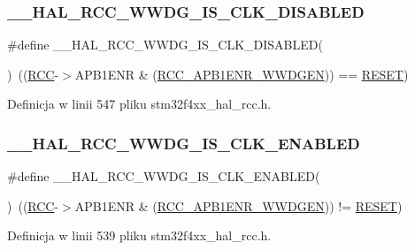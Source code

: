 \subsubsection{\texorpdfstring{\+\_\+\+\_\+\+H\+A\+L\+\_\+\+R\+C\+C\+\_\+\+W\+W\+D\+G\+\_\+\+I\+S\+\_\+\+C\+L\+K\+\_\+\+D\+I\+S\+A\+B\+L\+ED}{\_\_HAL\_RCC\_WWDG\_IS\_CLK\_DISABLED}}
{\footnotesize\ttfamily \#define \+\_\+\+\_\+\+H\+A\+L\+\_\+\+R\+C\+C\+\_\+\+W\+W\+D\+G\+\_\+\+I\+S\+\_\+\+C\+L\+K\+\_\+\+D\+I\+S\+A\+B\+L\+ED(\begin{DoxyParamCaption}{ }\end{DoxyParamCaption})~((\hyperlink{group___peripheral__declaration_ga74944438a086975793d26ae48d5882d4}{R\+CC}-\/$>$A\+P\+B1\+E\+NR \& (\hyperlink{group___peripheral___registers___bits___definition_gaf712b922ee776a972d2efa3da0ea4733}{R\+C\+C\+\_\+\+A\+P\+B1\+E\+N\+R\+\_\+\+W\+W\+D\+G\+EN})) == \hyperlink{group___exported__types_gga89136caac2e14c55151f527ac02daaffa589b7d94a3d91d145720e2fed0eb3a05}{R\+E\+S\+ET})}



Definicja w linii 547 pliku stm32f4xx\+\_\+hal\+\_\+rcc.\+h.

\mbox{\label{group___r_c_c___a_p_b1___peripheral___clock___enable___disable___status_ga9b26aff2638d1e0613b0ce0530f0cd48}} 
\subsubsection{\texorpdfstring{\+\_\+\+\_\+\+H\+A\+L\+\_\+\+R\+C\+C\+\_\+\+W\+W\+D\+G\+\_\+\+I\+S\+\_\+\+C\+L\+K\+\_\+\+E\+N\+A\+B\+L\+ED}{\_\_HAL\_RCC\_WWDG\_IS\_CLK\_ENABLED}}
{\footnotesize\ttfamily \#define \+\_\+\+\_\+\+H\+A\+L\+\_\+\+R\+C\+C\+\_\+\+W\+W\+D\+G\+\_\+\+I\+S\+\_\+\+C\+L\+K\+\_\+\+E\+N\+A\+B\+L\+ED(\begin{DoxyParamCaption}{ }\end{DoxyParamCaption})~((\hyperlink{group___peripheral__declaration_ga74944438a086975793d26ae48d5882d4}{R\+CC}-\/$>$A\+P\+B1\+E\+NR \& (\hyperlink{group___peripheral___registers___bits___definition_gaf712b922ee776a972d2efa3da0ea4733}{R\+C\+C\+\_\+\+A\+P\+B1\+E\+N\+R\+\_\+\+W\+W\+D\+G\+EN})) != \hyperlink{group___exported__types_gga89136caac2e14c55151f527ac02daaffa589b7d94a3d91d145720e2fed0eb3a05}{R\+E\+S\+ET})}



Definicja w linii 539 pliku stm32f4xx\+\_\+hal\+\_\+rcc.\+h.

